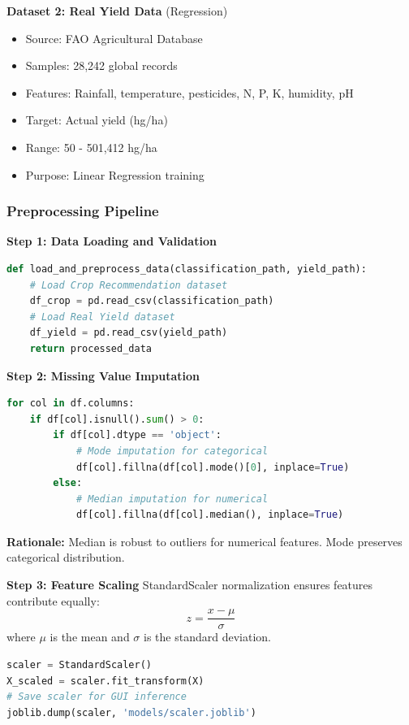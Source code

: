 \documentclass[conference]{IEEEtran}
\begin{document}
\textbf{Dataset 2: Real Yield Data} (Regression)
\begin{itemize}
    \item Source: FAO Agricultural Database
    \item Samples: 28,242 global records
    \item Features: Rainfall, temperature, pesticides, N, P, K, humidity, pH
    \item Target: Actual yield (hg/ha)
    \item Range: 50 - 501,412 hg/ha
    \item Purpose: Linear Regression training
\end{itemize}

\subsubsection{Preprocessing Pipeline}

\textbf{Step 1: Data Loading and Validation}
\begin{lstlisting}[language=Python, caption=Dual Dataset Loading]
def load_and_preprocess_data(classification_path, yield_path):
    # Load Crop Recommendation dataset
    df_crop = pd.read_csv(classification_path)
    # Load Real Yield dataset
    df_yield = pd.read_csv(yield_path)
    return processed_data
\end{lstlisting}

\textbf{Step 2: Missing Value Imputation}
\begin{lstlisting}[language=Python, caption=Missing Value Treatment]
for col in df.columns:
    if df[col].isnull().sum() > 0:
        if df[col].dtype == 'object':
            # Mode imputation for categorical
            df[col].fillna(df[col].mode()[0], inplace=True)
        else:
            # Median imputation for numerical
            df[col].fillna(df[col].median(), inplace=True)
\end{lstlisting}

\textbf{Rationale:} Median is robust to outliers for numerical features. Mode preserves categorical distribution.

\textbf{Step 3: Feature Scaling}
StandardScaler normalization ensures features contribute equally:
\begin{equation}
z = \frac{x - \mu}{\sigma}
\end{equation}
where $\mu$ is the mean and $\sigma$ is the standard deviation.

\begin{lstlisting}[language=Python, caption=Feature Scaling]
scaler = StandardScaler()
X_scaled = scaler.fit_transform(X)
# Save scaler for GUI inference
joblib.dump(scaler, 'models/scaler.joblib')
\end{lstlisting}
\end{document}
